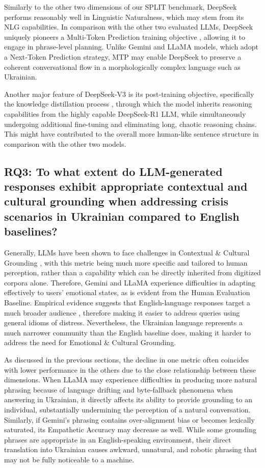 \documentclass[10pt, twocolumn]{article}
\begin{document}
Similarly to the other two dimensions of our SPLIT benchmark, DeepSeek performs reasonably well in Linguistic Naturalness, which may stem from its NLG capabilities. In comparison with the other two evaluated LLMs, DeepSeek uniquely pioneers a Multi-Token Prediction training objective \cite{deepseekai2025deepseekv3technicalreport}, allowing it to engage in phrase-level planning. Unlike Gemini and LLaMA models, which adopt a Next-Token Prediction strategy, MTP may enable DeepSeek to preserve a coherent conversational flow in a morphologically complex language such as Ukrainian.

Another major feature of DeepSeek-V3 is its post-training objective, specifically the knowledge distillation process \cite{deepseekai2025deepseekv3technicalreport}, through which the model inherits reasoning capabilities from the highly capable DeepSeek-R1 LLM, while simultaneously undergoing additional fine-tuning and eliminating long, chaotic reasoning chains. This might have contributed to the overall more human-like sentence structure in comparison with the other two models.


\subsection{RQ3: To what extent do LLM-generated responses exhibit appropriate contextual and cultural grounding when addressing crisis scenarios in Ukrainian compared to English baselines?}

Generally, LLMs have been shown to face challenges in Contextual \& Cultural Grounding \cite{rystrom2025multilingual}, with this metric being much more specific and tailored to human perception, rather than a capability which can be directly inherited from digitized corpora alone. Therefore, Gemini and LLaMA experience difficulties in adapting effectively to users' emotional states, as is evident from the Human Evaluation Baseline. Empirical evidence suggests that English-language responses target a much broader audience \cite{grattafiori2024llama3herdmodels,
deepseekai2025deepseekv3technicalreport}, therefore making it easier to address queries using general idioms of distress. Nevertheless, the Ukrainian language represents a much narrower community than the English baseline does, making it harder to address the need for Emotional \& Cultural Grounding.

As discussed in the previous sections, the decline in one metric often coincides with lower performance in the others due to the close relationship between these dimensions. When LLaMA may experience difficulties in producing more natural phrasing because of language drifting and byte-fallback phenomena when answering in Ukrainian, it directly affects its ability to provide grounding to an individual, substantially undermining the perception of a natural conversation. Similarly, if Gemini's phrasing contains over-alignment bias or becomes lexically saturated, its Empathetic Accuracy may decrease as well. While some grounding phrases are appropriate in an English-speaking environment, their direct translation into Ukrainian causes awkward, unnatural, and robotic phrasing that may not be fully noticeable to a machine.
\end{document}
